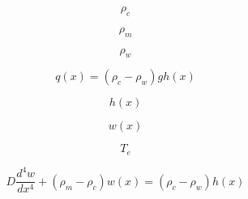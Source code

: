 \documentclass[12pt]{article}
\begin{document}
\begin{equation}
\rho_c
\end{equation}

\begin{equation}
\rho_m
\end{equation}

\begin{equation}
\rho_w
\end{equation}

\begin{equation}
q(x) = (\rho_c - \rho_w)gh(x)
\end{equation}

\begin{equation}
h(x)
\end{equation}

\begin{equation}
w(x)
\end{equation}

\begin{equation}
T_e
\end{equation}

\begin{equation}
D \frac{d^4 w}{dx^4} + (\rho_m - \rho_c) w(x) = (\rho_c - \rho_w) h(x)
\end{equation}
\end{document}
